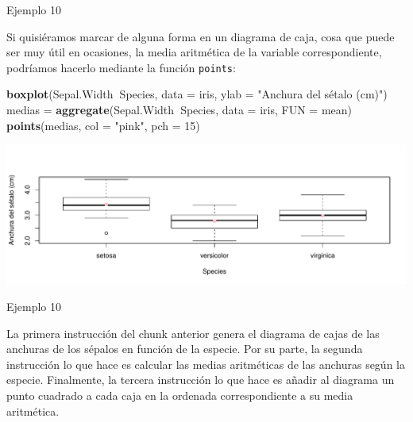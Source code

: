 \documentclass[
  ignorenonframetext,
]{beamer}
\newenvironment{Shaded}{\begin{snugshade}}{\end{snugshade}}
\newcommand{\DataTypeTok}[1]{\textcolor[rgb]{0.13,0.29,0.53}{#1}}
\newcommand{\DecValTok}[1]{\textcolor[rgb]{0.00,0.00,0.81}{#1}}
\newcommand{\KeywordTok}[1]{\textcolor[rgb]{0.13,0.29,0.53}{\textbf{#1}}}
\newcommand{\NormalTok}[1]{#1}
\newcommand{\OperatorTok}[1]{\textcolor[rgb]{0.81,0.36,0.00}{\textbf{#1}}}
\newcommand{\StringTok}[1]{\textcolor[rgb]{0.31,0.60,0.02}{#1}}
\begin{document}
\begin{frame}[fragile]{Ejemplo 10}
\protect\hypertarget{ejemplo-10-1}{}

Si quisiéramos marcar de alguna forma en un diagrama de caja, cosa que
puede ser muy útil en ocasiones, la media aritmética de la variable
correspondiente, podríamos hacerlo mediante la función \texttt{points}:

\begin{Shaded}
\begin{Highlighting}[]
\KeywordTok{boxplot}\NormalTok{(Sepal.Width}\OperatorTok{~}\NormalTok{Species, }\DataTypeTok{data =}\NormalTok{ iris, }\DataTypeTok{ylab =} \StringTok{"Anchura del sétalo (cm)"}\NormalTok{)}
\NormalTok{medias =}\StringTok{ }\KeywordTok{aggregate}\NormalTok{(Sepal.Width}\OperatorTok{~}\NormalTok{Species, }\DataTypeTok{data =}\NormalTok{ iris, }\DataTypeTok{FUN =}\NormalTok{ mean)}
\KeywordTok{points}\NormalTok{(medias, }\DataTypeTok{col =} \StringTok{"pink"}\NormalTok{, }\DataTypeTok{pch =} \DecValTok{15}\NormalTok{)}
\end{Highlighting}
\end{Shaded}

\includegraphics{Tema8.-Datos-Cuantitativos_files/figure-beamer/unnamed-chunk-31-1.pdf}

\end{frame}

\begin{frame}{Ejemplo 10}
\protect\hypertarget{ejemplo-10-2}{}

La primera instrucción del chunk anterior genera el diagrama de cajas de
las anchuras de los sépalos en función de la especie. Por su parte, la
segunda instrucción lo que hace es calcular las medias aritméticas de
las anchuras según la especie. Finalmente, la tercera instrucción lo que
hace es añadir al diagrama un punto cuadrado a cada caja en la ordenada
correspondiente a su media aritmética.

\end{frame}
\end{document}
